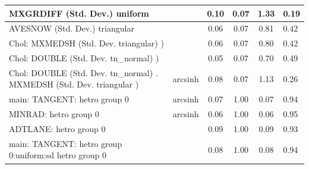 \begin{table}
\begin{center}
\begin{tabular}{|l|l|c|c|c|l|}
			\hline
			MXGRDIFF (Std. Dev.) uniform &  & 0.10 & 0.07 & 1.33 & 0.19 \\
			\hline
			AVESNOW (Std. Dev.) triangular &  & 0.06 & 0.07 & 0.81 & 0.42 \\
			\hline
			 Chol: MXMEDSH (Std. Dev. triangular) ) &  & 0.06 & 0.07 & 0.80 & 0.42 \\
			\hline
			 Chol: DOUBLE (Std. Dev. tn_normal) ) &  & 0.05 & 0.07 & 0.70 & 0.49 \\
			\hline
			 Chol: DOUBLE (Std. Dev. tn_normal) . MXMEDSH (Std. Dev.   triangular ) & arcsinh & 0.08 & 0.07 & 1.13 & 0.26 \\
			\hline
			main: TANGENT: hetro group 0 & arcsinh & 0.07 & 1.00 & 0.07 & 0.94 \\
			\hline
			MINRAD: hetro group 0 & arcsinh & 0.06 & 1.00 & 0.06 & 0.95 \\
			\hline
			ADTLANE: hetro group 0 &  & 0.09 & 1.00 & 0.09 & 0.93 \\
			\hline
			main: TANGENT: hetro group 0:uniform:sd  hetro group 0 &  & 0.08 & 1.00 & 0.08 & 0.94 \\
			\hline
		\end{tabular}
	\end{center}
\end{table}